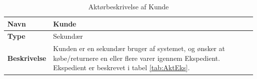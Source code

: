 \begin{table}[H]
	\label{KD}
	\begin{tabularx}{\textwidth}{|l|X|}
		\hline
		\textbf{Navn} & Kunde \\
		\hline
		\textbf{Type} & Sekundær \\
		\hline
		\textbf{Beskrivelse} & Kunden er en sekundær bruger af systemet, og ønsker at købe/returnere en eller flere varer igennem Ekspedient. Ekspedient er beskrevet i tabel \ref{tab:AktEks}.   \\
		\hline
	\end{tabularx}
	\captionsetup{justification=raggedright,singlelinecheck=false}
	\caption{Aktørbeskrivelse af Kunde}
	\label{tab:AktKu}
\end{table}
